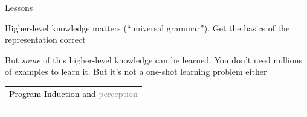 \documentclass{beamer}
\begin{document}

\begin{frame}{Lessons}

  Higher-level knowledge matters (``universal grammar''). Get the basics of the representation correct

  \vspace{1cm}

  But \emph{some} of this higher-level knowledge can be learned. You don't need millions of examples to learn it. But it's not a one-shot learning problem either

\end{frame}

\begin{frame}{}
  \begin{center}
    \begin{tabular}{l}
      {\textcolor{black}{Program Induction and }\textcolor{gray}{perception}}\\
      \phantom{Program Induction and }{\textcolor{gray}{learning to learn}}\\
      \phantom{Program Induction and }{\textcolor{gray}{model discovery}}\\
      \phantom{Program Induction and }{\textcolor{black}{the future}}
      \end{tabular}
  \end{center}
\end{frame}
\end{document}
